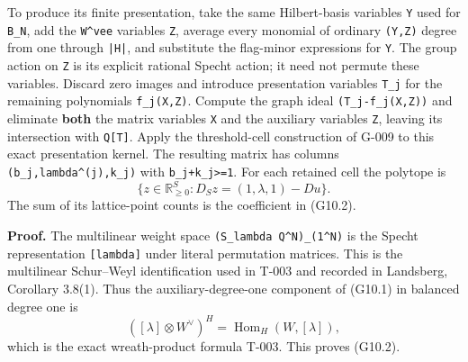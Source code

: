 \documentclass[
  10pt,
]{article}
\begin{document}
To produce its finite presentation, take the same Hilbert-basis
variables \texttt{\small Y} used for \texttt{\small B\_\allowbreak{}N},
add the \texttt{\small W\textasciicircum{}vee} variables
\texttt{\small Z}, average every monomial of ordinary
\texttt{\small (\allowbreak{}Y,\allowbreak{}Z)\allowbreak{}} degree from
one through \texttt{\small |H|}, and substitute the flag-minor
expressions for \texttt{\small Y}. The group action on \texttt{\small Z}
is its explicit rational Specht action; it need not permute these
variables. Discard zero images and introduce presentation variables
\texttt{\small T\_\allowbreak{}j} for the remaining polynomials
\texttt{\small f\_\allowbreak{}j(\allowbreak{}X,\allowbreak{}Z)\allowbreak{}}.
Compute the graph ideal
\texttt{\small (\allowbreak{}T\_\allowbreak{}j-\allowbreak{}f\_\allowbreak{}j(\allowbreak{}X,\allowbreak{}Z)\allowbreak{})\allowbreak{}}
and eliminate \textbf{both} the matrix variables \texttt{\small X} and
the auxiliary variables \texttt{\small Z}, leaving its intersection with
\texttt{\small Q[\allowbreak{}T]\allowbreak{}}. Apply the threshold-cell
construction of G-009 to this exact presentation kernel. The resulting
matrix has columns
\texttt{\small (\allowbreak{}b\_\allowbreak{}j,\allowbreak{}lambda\textasciicircum{}(\allowbreak{}j)\allowbreak{},\allowbreak{}k\_\allowbreak{}j)\allowbreak{}}
with
\texttt{\small b\_\allowbreak{}j+\allowbreak{}k\_\allowbreak{}j>=\allowbreak{}1}.
For each retained cell the polytope is \[
\{z\in\mathbb R_{\ge0}^{S}:
D_Sz=(1,\lambda,1)-Du\}.
\tag{G10.3}
\] The sum of its lattice-point counts is the coefficient in (G10.2).

\textbf{Proof.} The multilinear weight space
\texttt{\small (\allowbreak{}S\_\allowbreak{}lambda Q\textasciicircum{}N)\allowbreak{}\_\allowbreak{}(\allowbreak{}1\textasciicircum{}N)\allowbreak{}}
is the Specht representation
\texttt{\small [\allowbreak{}lambda]\allowbreak{}} under literal
permutation matrices. This is the multilinear Schur--Weyl identification
used in T-003 and recorded in Landsberg, Corollary 3.8(1). Thus the
auxiliary-degree-one component of (G10.1) in balanced degree one is \[
([\lambda]\otimes W^\vee)^H
=\operatorname{Hom}_H(W,[\lambda]),
\] which is the exact wreath-product formula T-003. This proves (G10.2).
\end{document}
